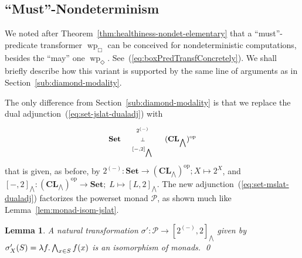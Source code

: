 \documentclass[9pt, preprint]{sigplanconf}
\theoremstyle{theorem}
\newtheorem{lemma}[theorem]{Lemma}
\theoremstyle{definition}
\newtheorem{remark}[theorem]{Remark}
\newcommand{\notyet}{\textcolor{red}{(not yet)\ }}
\newcommand{\pow}{\mathcal{P}}
\newcommand{\place}{{-}}
\newcommand{\op}{\mathrm{op}}
\newcommand{\Set}{\mathbf{Set}}
\newcommand{\CL}{\mathbf{CL}}
\newcommand{\biglor}{\bigvee}
\newcommand{\bigland}{\bigwedge}
\newif\ifignore \ignorefalse
\newcommand{\auxproof}[1]{
\ifignore\mbox{}\newline
\textbf{BEGIN: AUX-PROOF} \dotfill\newline
{#1}\mbox{}\newline
\textbf{END: AUX-PROOF}\dotfill\newline
\fi}
\newcommand{\wpre}{\mathop{\mathrm{wp}}\nolimits}
\begin{document}
\auxproof{
\begin{remark}
  \label{rem:construct-monad-map}
 \notyet
  The definition of the  map $\sigma_X$ in
  Lemma~\ref{lem:monad-isom-jslat} can alternatively be described as
  follows. This alternative definition will be the basis of our
  generalized construction in ???.

  Let us define $\sigma''_X \colon \pow X \to [2^X, 2]_{\biglor}$ as follows.
  Given $S \in \pow X$ and $f \colon X \to 2$,
  we first extend $f$ to a join-preserving map
  $f^{\sharp} \colon \pow X \to 2$.
  Here we use the join-semilattice structure of $2$
  and the fact that $\pow X$ is the free join-semilattice
  over $X$.   We define $\sigma''_X(S)(f) = f^{\sharp}(S)$;
  it is then not hard to see that $\sigma=\sigma''$.










\end{remark}
}

\subsection{``Must''-Nondeterminism}
\label{sub:box-modality}
We noted after Theorem~\ref{thm:healthiness-nondet-elementary} that a
``must''-predicate transformer $\wpre_{\Box}$ can be conceived for
nondeterministic computations, besides the ``may'' one
$\wpre_{\Diamond}$. See~(\ref{eq:boxPredTransfConcretely}).
We shall briefly describe how this variant is supported by
the same line of arguments as in
Section~\ref{sub:diamond-modality}.

The only difference from Section~\ref{sub:diamond-modality} is that we replace the dual adjunction~(\ref{eq:set-jslat-dualadj}) with
\begin{align}
  \label{eq:set-mslat-dualadj}
\small\begin{array}{l}
  \vcenter{\xymatrix@1@C+3em{
    \Set \ar@/^/[r]^-{2^{(\place)}} \ar@{}[r]|-{\bot}
    & (\CL_{\bigwedge})^{\op} \ar@/^/[l]^-{[\place, 2]_{\bigwedge}}
  }}
\end{array}
\end{align}
that is given, as before, by
$2^{(\place)} \colon \Set \to (\CL_{\bigland})^{\op};  X \mapsto
2^X$, and
$[\place, 2]_{\bigland} \colon (\CL_{\bigland})^{\op} \to \Set;\;  L \mapsto [L, 2]_{\bigland}$.
The new adjunction~(\ref{eq:set-mslat-dualadj})  factorizes the
powerset monad $\pow$, as shown much like Lemma~\ref{lem:monad-isom-jslat}.
\begin{lemma}\label{lem:monad-isom-mslat}
 A natural transformation $\sigma' \colon \pow \to [2^{(\place)}, 2]_{\bigwedge}$
 given by $\sigma'_X(S) = \lambda f \ldotp \bigland_{x \in S}  f(x)$ is
  an isomorphism of monads. \qed
\end{lemma}
\end{document}
